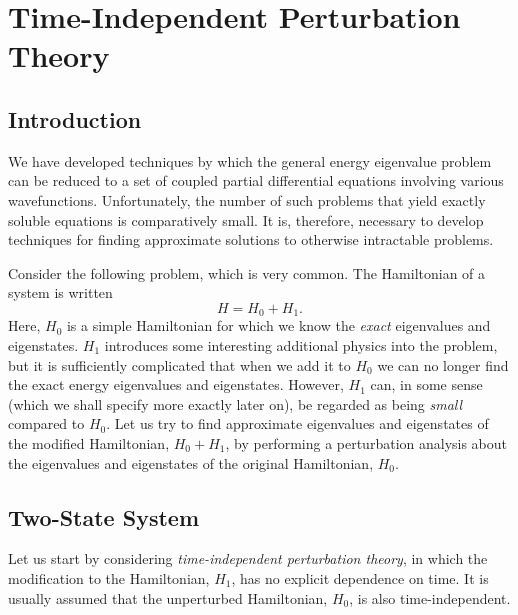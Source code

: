 \chapter{Time-Independent Perturbation Theory}

\section{Introduction}
We have developed techniques by which the general energy eigenvalue problem
can be reduced to a set of coupled partial differential equations involving
various wavefunctions. Unfortunately, the number of such problems that yield
exactly soluble equations is comparatively small. It is, therefore,  necessary to develop techniques for finding
approximate solutions to otherwise intractable problems. 

Consider the following problem, which is very common. The Hamiltonian of a
system  is  written
\begin{equation}
H = H_0 + H_1.
\end{equation}
Here, $H_0$ is a simple Hamiltonian for which we know
the {\em exact}\/ eigenvalues and eigenstates. $H_1$ introduces some
interesting additional physics into the problem, but it is sufficiently
complicated that when we add it to $H_0$ we can no longer find the exact
energy eigenvalues and eigenstates. However, $H_1$ can, in some sense
(which we shall specify more exactly later on), be regarded as 
being {\em small}\/ compared to $H_0$. Let us try to find approximate  eigenvalues
and eigenstates of the modified Hamiltonian, $H_0+H_1$, by performing a perturbation analysis about the   eigenvalues
and eigenstates of the original Hamiltonian, $H_0$. 


\section{Two-State System}
Let us start by considering {\em time-independent perturbation theory},
in which the modification to the Hamiltonian, $H_1$, has no explicit
dependence on time. It is usually assumed that the unperturbed 
Hamiltonian, $H_0$, is also time-independent. 

